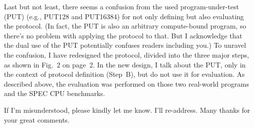 \documentclass[10pt,letterpaper]{article}
\begin{document}
Last but not least, there seems a confusion from the used program-under-test (PUT) (e.g., PUT128 and PUT16384) 
for not only defining but also evaluating the protocol. (In fact, the PUT is also an arbitrary \hbox{compute-bound} program, 
so there's no problem with applying the protocol to that. But I acknowledge that the dual use of the PUT potentially confuses readers including you.)
To unravel the confusion, I have redesigned the protocol, divided into the three major steps, as shown in Fig.~2 on page~2. 
In the new design, I talk about the PUT, only in the context of protocol definition (Step~B), but do not use it for evaluation. 
As described above, the evaluation was performed on those two real-world programs and the SPEC CPU benchmarks.


%
%
%
%
%

If I'm misunderstood, please kindly let me know. I'll re-address. Many thanks for your great comments.
\end{document}
